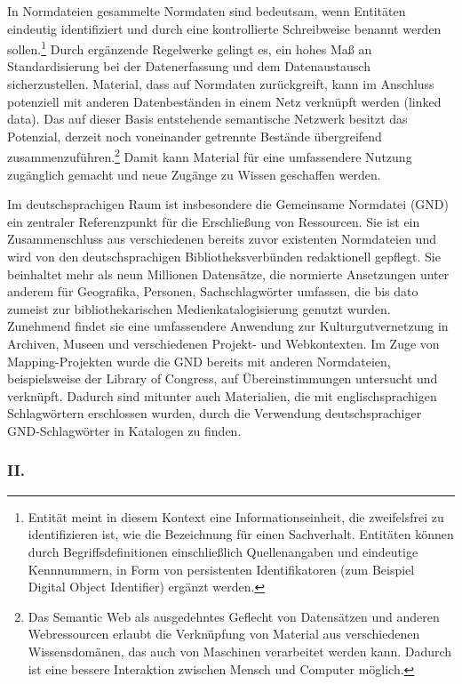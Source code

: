 \documentclass[a4paper,
fontsize=11pt,
oneside,
numbers=noperiodatend,
parskip=half-,
bibliography=totoc,
final
]{scrartcl}
\begin{document}
In Normdateien gesammelte Normdaten sind bedeutsam, wenn Entitäten
eindeutig identifiziert und durch eine kontrollierte Schreibweise
benannt werden sollen.\footnote{Entität meint in diesem Kontext eine
  Informationseinheit, die zweifelsfrei zu identifizieren ist, wie die
  Bezeichnung für einen Sachverhalt. Entitäten können durch
  Begriffsdefinitionen einschließlich Quellenangaben und eindeutige
  Kennnummern, in Form von persistenten Identifikatoren (zum Beispiel
  Digital Object Identifier) ergänzt werden.} Durch ergänzende
Regelwerke gelingt es, ein hohes Maß an Standardisierung bei der
Datenerfassung und dem Datenaustausch sicherzustellen. Material, dass
auf Normdaten zurückgreift, kann im Anschluss potenziell mit anderen
Datenbeständen in einem Netz verknüpft werden (linked data). Das auf
dieser Basis entstehende semantische Netzwerk besitzt das Potenzial,
derzeit noch voneinander getrennte Bestände übergreifend
zusammenzuführen.\footnote{Das Semantic Web als ausgedehntes Geflecht
  von Datensätzen und anderen Webressourcen erlaubt die Verknüpfung von
  Material aus verschiedenen Wissensdomänen, das auch von Maschinen
  verarbeitet werden kann. Dadurch ist eine bessere Interaktion zwischen
  Mensch und Computer möglich.} Damit kann Material für eine
umfassendere Nutzung zugänglich gemacht und neue Zugänge zu Wissen
geschaffen werden.

Im deutschsprachigen Raum ist insbesondere die Gemeinsame Normdatei
(GND) ein zentraler Referenzpunkt für die Erschließung von Ressourcen.
Sie ist ein Zusammenschluss aus verschiedenen bereits zuvor existenten
Normdateien und wird von den deutschsprachigen Bibliotheksverbünden
redaktionell gepflegt. Sie beinhaltet mehr als neun Millionen
Datensätze, die normierte Ansetzungen unter anderem für Geografika,
Personen, Sachschlagwörter umfassen, die bis dato zumeist zur
bibliothekarischen Medienkatalogisierung genutzt wurden. Zunehmend
findet sie eine umfassendere Anwendung zur Kulturgutvernetzung in
Archiven, Museen und verschiedenen Projekt- und Webkontexten. Im Zuge
von Mapping-Projekten wurde die GND bereits mit anderen Normdateien,
beispielsweise der Library of Congress, auf Übereinstimmungen untersucht
und verknüpft. Dadurch sind mitunter auch Materialien, die mit
englischsprachigen Schlagwörtern erschlossen wurden, durch die
Verwendung deutschsprachiger GND-Schlagwörter in Katalogen zu finden.

\hypertarget{ii.}{%
\subsubsection{II.}\label{ii.}}
\end{document}
